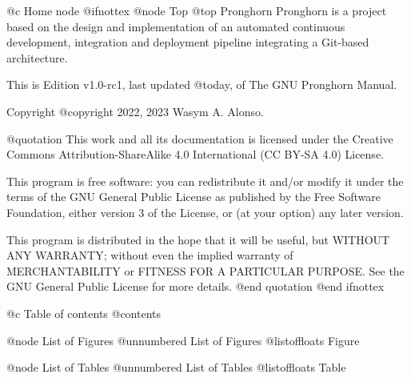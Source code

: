 @c Home node
@ifnottex
@node Top
@top Pronghorn
Pronghorn is a project based on the design and implementation of an automated continuous development, integration and deployment pipeline integrating a Git-based architecture.

This is Edition v1.0-rc1, last updated @today{}, of The GNU Pronghorn Manual.

Copyright @copyright{} 2022, 2023 Wasym A. Alonso.

@quotation
This work and all its documentation is licensed under the Creative Commons Attribution-ShareAlike 4.0 International (CC BY-SA 4.0) License.

This program is free software: you can redistribute it and/or modify it under the terms of the GNU General Public License as published by the Free Software Foundation, either version 3 of the License, or (at your option) any later version.

This program is distributed in the hope that it will be useful, but WITHOUT ANY WARRANTY; without even the implied warranty of MERCHANTABILITY or FITNESS FOR A PARTICULAR PURPOSE. See the GNU General Public License for more details.
@end quotation
@end ifnottex

@c Table of contents
@contents

@node List of Figures
@unnumbered List of Figures
@listoffloats Figure

@node List of Tables
@unnumbered List of Tables
@listoffloats Table
